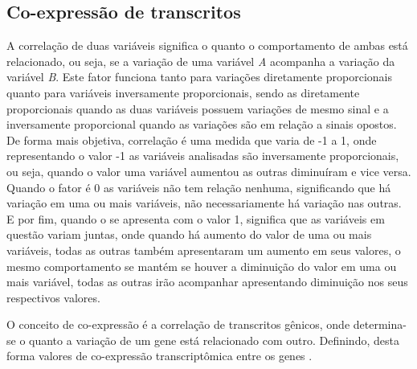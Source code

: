 

\subsection{Co-expressão de transcritos}

A correlação de duas variáveis significa o quanto o comportamento de ambas está relacionado, ou seja, se a variação de uma variável \textsl{A} acompanha a variação da variável \textsl{B}. Este fator funciona tanto para variações diretamente proporcionais quanto para variáveis inversamente proporcionais, sendo as diretamente proporcionais quando as duas variáveis possuem variações de mesmo sinal e a inversamente proporcional quando as variações são em relação a sinais opostos.
De forma mais objetiva, correlação é uma medida que varia de -1 a 1, onde representando o valor -1 as variáveis analisadas são inversamente proporcionais, ou seja, quando o valor uma variável aumentou as outras diminuíram e vice versa. Quando o fator é 0 as variáveis não tem relação nenhuma, significando que há variação em uma ou mais variáveis, não necessariamente há variação nas outras. E por fim, quando o se apresenta com o valor 1, significa que as variáveis em questão variam juntas, onde quando há aumento do valor de uma ou mais variáveis, todas as outras também apresentaram um aumento em seus valores, o mesmo comportamento se mantém se houver a diminuição do valor em uma ou mais variável, todas as outras irão acompanhar apresentando diminuição nos seus respectivos valores.

O conceito de co-expressão é a correlação de transcritos gênicos, onde determina-se o quanto a variação de um gene está relacionado com outro. Definindo, desta forma valores de co-expressão transcriptômica entre os genes
\cite{Gaiteri2014}.






